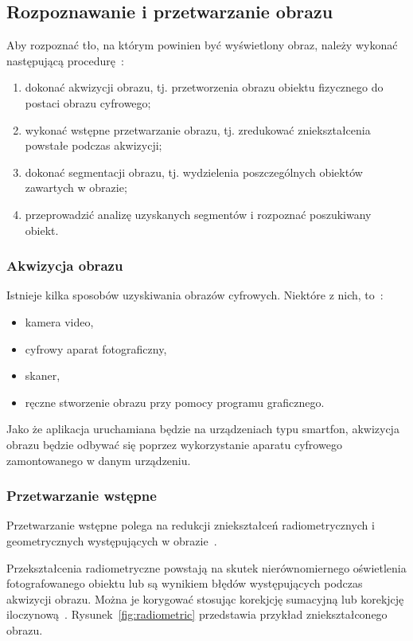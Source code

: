 \subsection{Rozpoznawanie i przetwarzanie obrazu}
Aby rozpoznać tło, na którym powinien być wyświetlony obraz, należy wykonać następującą procedurę~\cite{graf:przet:obr}:
\begin{enumerate}
 \item dokonać akwizycji obrazu, tj. przetworzenia obrazu obiektu fizycznego do postaci obrazu cyfrowego;
 \item wykonać wstępne przetwarzanie obrazu, tj. zredukować zniekształcenia powstałe podczas akwizycji;
 \item dokonać segmentacji obrazu, tj. wydzielenia poszczególnych obiektów zawartych w obrazie;
 \item przeprowadzić analizę uzyskanych segmentów i rozpoznać poszukiwany obiekt.
\end{enumerate}

\subsubsection{Akwizycja obrazu}
Istnieje kilka sposobów uzyskiwania obrazów cyfrowych.
Niektóre z nich, to~\cite{anal:przet:obr}:
\begin{itemize}
 \item kamera video,
 \item cyfrowy aparat fotograficzny,
 \item skaner,
 \item ręczne stworzenie obrazu przy pomocy programu graficznego.
\end{itemize}

Jako że aplikacja uruchamiana będzie na urządzeniach typu smartfon, akwizycja obrazu będzie odbywać się poprzez wykorzystanie aparatu cyfrowego zamontowanego w danym urządzeniu.

\subsubsection{Przetwarzanie wstępne}
Przetwarzanie wstępne polega na redukcji zniekształceń radiometrycznych i geometrycznych występujących w obrazie~\cite{anal:przet:obr}.

Przekształcenia radiometryczne powstają na skutek nierównomiernego oświetlenia fotografowanego obiektu lub są wynikiem błędów występujących podczas akwizycji obrazu.
Można je korygować stosując korekjcję sumacyjną lub korekjcję iloczynową~\cite{graf:przet:obr}.
Rysunek~\ref{fig:radiometric} przedstawia przykład zniekształconego obrazu.

